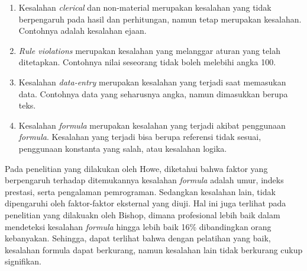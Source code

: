 \begin{enumerate}
    \item Kesalahan \textit{clerical} dan non-material merupakan kesalahan yang tidak berpengaruh pada hasil dan perhitungan, namun tetap merupakan kesalahan. Contohnya adalah kesalahan ejaan.
    \item \textit{Rule violations} merupakan kesalahan yang melanggar aturan yang telah ditetapkan. Contohnya nilai seseorang tidak boleh melebihi angka 100.
    \item Kesalahan \textit{data-entry} merupakan kesalahan yang terjadi saat memasukan data. Contohnya data yang seharusnya angka, namun dimasukkan berupa teks.
    \item Kesalahan \textit{formula}  merupakan kesalahan yang terjadi akibat penggunaan \textit{formula}. Kesalahan yang terjadi bisa berupa referensi tidak sesuai, penggunaan konstanta yang salah, atau kesalahan logika.
\end{enumerate}

Pada penelitian yang dilakukan oleh Howe, diketahui bahwa faktor yang berpengaruh terhadap ditemukannya kesalahan \textit{formula} adalah umur, indeks prestasi, serta pengalaman pemrograman. Sedangkan kesalahan lain, tidak dipengaruhi oleh faktor-faktor eksternal yang diuji. \citep{Howe2006} Hal ini juga terlihat pada penelitian yang dilakuakn oleh Bishop, dimana profesional lebih baik dalam mendeteksi kesalahan \textit{formula} hingga lebih baik 16\% dibandingkan orang kebanyakan. \citep{bishop2008empirical} Sehingga, dapat terlihat bahwa dengan pelatihan yang baik, kesalahan formula dapat berkurang, namun kesalahan lain tidak berkurang cukup signifikan.


